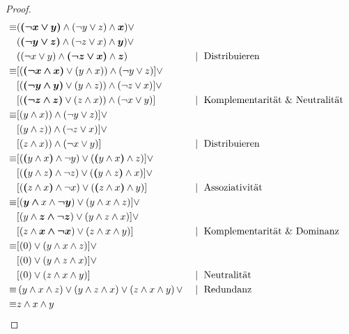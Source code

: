 \documentclass[10pt,a4paper]{article}
\begin{document}
\begin{proof}
\begin{align}
\equiv
%
& ( \bm{\left(\neg x \vee y\right)} \wedge \left(\neg y \vee z\right) \wedge  \bm{x}) \vee \notag\\
& ( \bm{\left(\neg y \vee z\right)} \wedge \left(\neg z \vee x\right) \wedge  \bm{y}) \vee \notag\\
& (\left(\neg x \vee y\right) \wedge  \bm{\left(\neg z \vee x\right)} \wedge  \bm{z})
 && \mid\text{ Distribuieren}\\
\equiv
%
& [ (\bm{\left(\neg x \wedge x\right)} \vee \left(y \wedge x\right)) \wedge \left(\neg y \vee z\right)] \vee \notag\\
& [ (\bm{\left(\neg y \wedge y\right)} \vee \left(y \wedge z\right)) \wedge \left(\neg z \vee x\right)] \vee \notag\\
& [ (\bm{\left(\neg z \wedge z\right)} \vee \left(z \wedge x\right)) \wedge \left(\neg x \vee y\right)] && \mid\text{ Komplementarit\"at \& Neutralit\"at}\\
\equiv
%
& [\left(y \wedge x\right)) \wedge \left(\neg y \vee z\right)] \vee \notag\\
& [\left(y \wedge z\right)) \wedge \left(\neg z \vee x\right)] \vee \notag\\
& [\left(z \wedge x\right)) \wedge \left(\neg x \vee y\right)]
 && \mid\text{ Distribuieren}\\
\equiv
%
& [\left( \bm{\left(}y \wedge x \bm{\right)} \wedge \neg y) \vee ( \bm{\left(}y \wedge x \bm{\right)} \wedge z\right)] \vee \notag\\
& [\left( \bm{\left(}y \wedge z \bm{\right)} \wedge \neg z) \vee ( \bm{\left(}y \wedge z \bm{\right)} \wedge x\right)] \vee \notag\\
& [\left( \bm{\left(}z \wedge x \bm{\right)} \wedge \neg x) \vee ( \bm{\left(}z \wedge x \bm{\right)} \wedge y\right)]
 && \mid\text{ Assoziativit\"at}\\
\equiv
%
& [\left( \bm{y \wedge} x \wedge  \bm{\neg y}) \vee (y \wedge x \wedge z\right)] \vee \notag\\
& [\left(y \wedge  \bm{z \wedge \neg z}) \vee (y \wedge z \wedge x\right)] \vee \notag\\
& [\left(z \wedge  \bm{x \wedge \neg x}) \vee (z \wedge x \wedge y\right)]
 && \mid\text{ Komplementarit\"at \& Dominanz}\\
\equiv
%
& [\left(0) \vee (y \wedge x \wedge z\right)] \vee \notag\\
& [\left(0) \vee (y \wedge z \wedge x\right)] \vee \notag\\
& [\left(0) \vee (z \wedge x \wedge y\right)] && \mid\text{ Neutralit\"at}\\
\equiv
%
& \left(y \wedge x \wedge z\right) \vee
\left(y \wedge z \wedge x\right) \vee
\left(z \wedge x \wedge y\right) \vee && \mid\text{ Redundanz}\\
\equiv 
%
& z \wedge x \wedge y && \qedhere
\end{align}
\end{proof}
\end{document}
